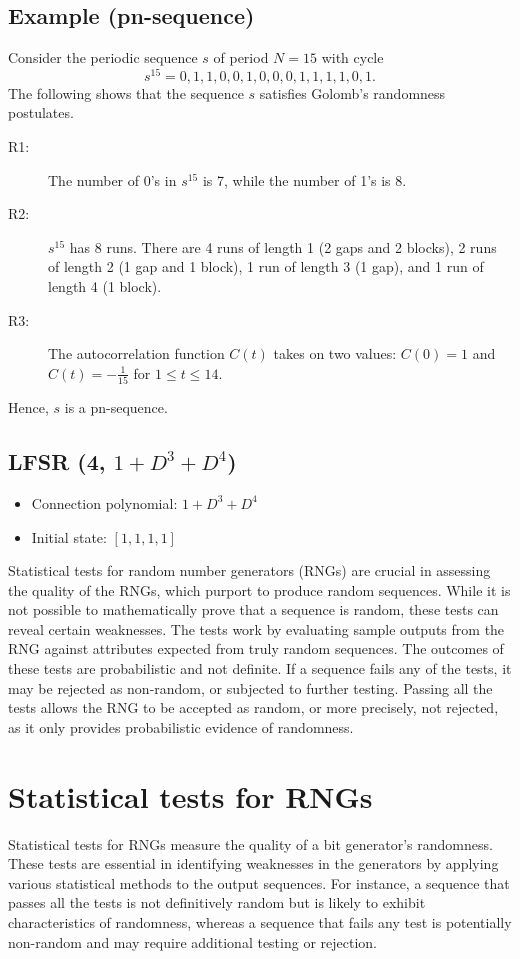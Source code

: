\documentclass[12pt,openany]{book}
\theoremstyle{definition}
\begin{document}
\subsection*{Example (pn-sequence)}
Consider the periodic sequence \( s \) of period \( N = 15 \) with cycle
\[ s^{15} = 0, 1, 1, 0, 0, 1, 0, 0, 0, 1, 1, 1, 1, 0, 1. \]
The following shows that the sequence \( s \) satisfies Golomb's randomness postulates.
\begin{description}
	\item[R1:] The number of 0's in \( s^{15} \) is 7, while the number of 1's is 8.
	\item[R2:] \( s^{15} \) has 8 runs. There are 4 runs of length 1 (2 gaps and 2 blocks), 2 runs of length 2 (1 gap and 1 block), 1 run of length 3 (1 gap), and 1 run of length 4 (1 block).
	\item[R3:] The autocorrelation function \( C(t) \) takes on two values: \( C(0) = 1 \) and \( C(t) = -\frac{1}{15} \) for \( 1 \leq t \leq 14 \).
\end{description}
Hence, \( s \) is a pn-sequence.

\subsection*{LFSR (4, \( 1 + D^3 + D^4 \))}
\begin{itemize}
	\item Connection polynomial: \( 1 + D^3 + D^4 \)
	\item Initial state: \( [1, 1, 1, 1] \)
\end{itemize}


\newpage
Statistical tests for random number generators (RNGs) are crucial in assessing the quality of the RNGs, which purport to produce random sequences. While it is not possible to mathematically prove that a sequence is random, these tests can reveal certain weaknesses. The tests work by evaluating sample outputs from the RNG against attributes expected from truly random sequences. The outcomes of these tests are probabilistic and not definite. If a sequence fails any of the tests, it may be rejected as non-random, or subjected to further testing. Passing all the tests allows the RNG to be accepted as random, or more precisely, not rejected, as it only provides probabilistic evidence of randomness.

\section{Statistical tests for RNGs}
Statistical tests for RNGs measure the quality of a bit generator's randomness. These tests are essential in identifying weaknesses in the generators by applying various statistical methods to the output sequences. For instance, a sequence that passes all the tests is not definitively random but is likely to exhibit characteristics of randomness, whereas a sequence that fails any test is potentially non-random and may require additional testing or rejection.
\end{document}
